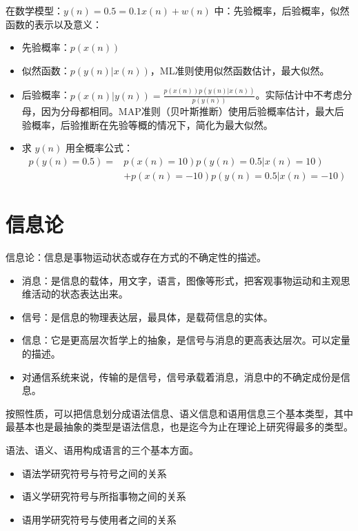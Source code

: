 \begin{remark}
    在数学模型：$y(n) = 0.5 = 0.1x(n) + w(n)$ 中：先验概率，后验概率，似然函数的表示以及意义：
    \begin{itemize}
        \item 先验概率：$p(x(n))$
        \item 似然函数：$p(y(n)|x(n))$，ML准则使用似然函数估计，最大似然。
        \item 后验概率：$p(x(n)|y(n)) = \frac{p(x(n))p(y(n)|x(n))}{p(y(n))}$。实际估计中不考虑分母，因为分母都相同。MAP准则（贝叶斯推断）使用后验概率估计，最大后验概率，后验推断在先验等概的情况下，简化为最大似然。
        \item 求 $y(n)$ 用全概率公式：\begin{align*}
            p(y(n) = 0.5) =& p(x(n) = 10)p(y(n) = 0.5 | x(n) = 10) \\
            &+ p(x(n) = -10)p(y(n) = 0.5 | x(n) = -10)
        \end{align*}
    \end{itemize}
\end{remark}

\section{信息论}
\begin{remark}
    信息论：信息是事物运动状态或存在方式的不确定性的描述。
    \begin{itemize}
        \item 消息：是信息的载体，用文字，语言，图像等形式，把客观事物运动和主观思维活动的状态表达出来。
        \item 信号：是信息的物理表达层，最具体，是载荷信息的实体。
        \item 信息：它是更高层次哲学上的抽象，是信号与消息的更高表达层次。可以定量的描述。
        \item 对通信系统来说，传输的是信号，信号承载着消息，消息中的不确定成份是信息。
    \end{itemize}
\end{remark}

\begin{remark}
    按照性质，可以把信息划分成语法信息、语义信息和语用信息三个基本类型，其中最基本也是最抽象的类型是语法信息，也是迄今为止在理论上研究得最多的类型。

    语法、语义、语用构成语言的三个基本方面。
    \begin{itemize}
        \item 语法学研究符号与符号之间的关系
        \item 语义学研究符号与所指事物之间的关系
        \item 语用学研究符号与使用者之间的关系
    \end{itemize}
\end{remark}

